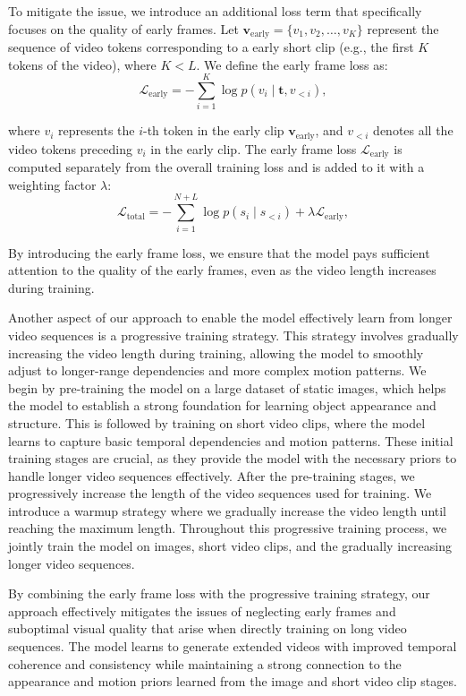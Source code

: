 To mitigate the issue, we introduce an additional loss term that specifically focuses on the quality of early frames. Let $\mathbf{v}_{\text{early}} = \{v_1, v_2, \ldots, v_K\}$ represent the sequence of video tokens corresponding to a early short clip (e.g., the first $K$ tokens of the video), where $K < L$. We define the early frame loss as:
\begin{equation}
\mathcal{L}_{\text{early}} = -\sum_{i=1}^{K} \log p(v_i \mid \mathbf{t}, v_{<i}),
\end{equation}

where $v_i$ represents the $i$-th token in the early clip $\mathbf{v}_{\text{early}}$, and $v_{<i}$ 
denotes all the video tokens preceding $v_i$ in the early clip. The early frame loss $\mathcal{L}_{\text{early}}$ is computed separately from the overall training loss and is added to it with a weighting factor $\lambda$:
\begin{equation}
\mathcal{L}_{\text{total}} = -\sum_{i=1}^{N+L} \log p(s_i \mid s_{<i}) + \lambda \mathcal{L}_{\text{early}},
\end{equation}

By introducing the early frame loss, we ensure that the model pays sufficient attention to the quality of the early frames, even as the video length increases during training.

Another aspect of our approach to enable the model effectively learn from longer video sequences is a progressive training strategy. This strategy involves gradually increasing the video length during training, allowing the model to smoothly adjust to longer-range dependencies and more complex motion patterns. 
We begin by pre-training the model on a large dataset of static images, which helps the model to establish a strong foundation for learning object appearance and structure. This is followed by training on short video clips, where the model learns to capture basic temporal dependencies and motion patterns. These initial training stages are crucial, as they provide the model with the necessary priors to handle longer video sequences effectively. After the pre-training stages, we progressively increase the length of the video sequences used for training. We introduce a warmup strategy where we gradually increase the video length until reaching the maximum length. Throughout this progressive training process, we jointly train the model on images, short video clips, and the gradually increasing longer video sequences. 

By combining the early frame loss with the progressive training strategy, our approach effectively mitigates the issues of neglecting early frames and suboptimal visual quality that arise when directly training on long video sequences. The model learns to generate extended videos with improved temporal coherence and consistency while maintaining a strong connection to the appearance and motion priors learned from the image and short video clip stages.

